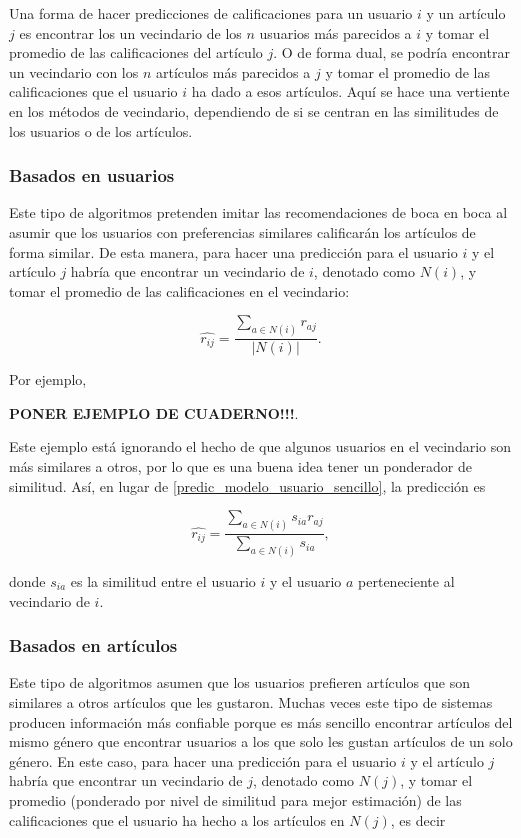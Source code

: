 Una forma de hacer predicciones de calificaciones para un usuario $i$ y un artículo $j$ es encontrar los un vecindario de los $n$ usuarios más parecidos a $i$ y tomar el promedio de las calificaciones del artículo $j$. O de forma dual, se podría encontrar un vecindario con los $n$ artículos más parecidos a $j$ y tomar el promedio de las calificaciones que el usuario $i$ ha dado a esos artículos. Aquí se hace una vertiente en los métodos de vecindario, dependiendo de si se centran en las similitudes de los usuarios o de los artículos.

\subsubsection{Basados en usuarios}

Este tipo de algoritmos pretenden imitar las recomendaciones de boca en boca al asumir que los usuarios con preferencias similares calificarán los artículos de forma similar. De esta manera, para hacer una predicción para el usuario $i$ y el artículo $j$ habría que encontrar un vecindario de $i$, denotado como $N(i)$, y tomar el promedio de las calificaciones en el vecindario:

\begin{equation}\label{predic_modelo_usuario_sencillo}
 \hat{r_{ij}} = \frac{\sum_{a \in N(i)} r_{aj}}{\vert N(i) \vert}.
\end{equation}

Por ejemplo,

\textbf{PONER EJEMPLO DE CUADERNO!!!}.

Este ejemplo está ignorando el hecho de que algunos usuarios en el vecindario son más similares a otros, por lo que es una buena idea tener un ponderador de similitud. Así, en lugar de \ref{predic_modelo_usuario_sencillo}, la predicción es

\begin{equation}\label{predic_modelo_usuario_ponderado}
 \hat{r_{ij}} = \frac{\sum_{a \in N(i)} s_{ia} r_{aj}}{\sum_{a \in N(i)} s_{ia}},
\end{equation}

donde $s_{ia}$ es la similitud entre el usuario $i$ y el usuario $a$ perteneciente al vecindario de $i$.

\subsubsection{Basados en artículos}

Este tipo de algoritmos asumen que los usuarios prefieren artículos que son similares a otros artículos que les gustaron. Muchas veces este tipo de sistemas producen información más confiable porque es más sencillo encontrar artículos del mismo género que encontrar usuarios a los que solo les gustan artículos de un solo género. En este caso, para hacer una predicción para el usuario $i$ y el artículo $j$ habría que encontrar un vecindario de $j$, denotado como $N(j)$, y tomar el promedio (ponderado por nivel de similitud para mejor estimación) de las calificaciones que el usuario ha hecho a los artículos en $N(j)$, es decir

